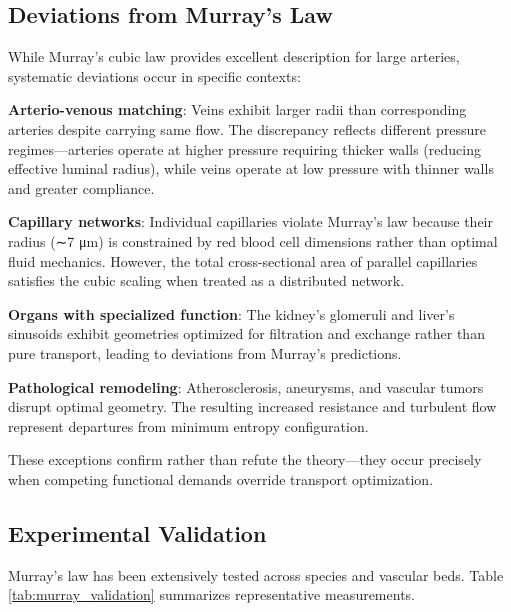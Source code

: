 \documentclass[12pt,a4paper]{article}
\theoremstyle{remark}
\begin{document}
\subsection{Deviations from Murray's Law}

While Murray's cubic law provides excellent description for large arteries, systematic deviations occur in specific contexts:

\textbf{Arterio-venous matching}: Veins exhibit larger radii than corresponding arteries despite carrying same flow. The discrepancy reflects different pressure regimes—arteries operate at higher pressure requiring thicker walls (reducing effective luminal radius), while veins operate at low pressure with thinner walls and greater compliance.

\textbf{Capillary networks}: Individual capillaries violate Murray's law because their radius (∼7 μm) is constrained by red blood cell dimensions rather than optimal fluid mechanics. However, the total cross-sectional area of parallel capillaries satisfies the cubic scaling when treated as a distributed network.

\textbf{Organs with specialized function}: The kidney's glomeruli and liver's sinusoids exhibit geometries optimized for filtration and exchange rather than pure transport, leading to deviations from Murray's predictions.

\textbf{Pathological remodeling}: Atherosclerosis, aneurysms, and vascular tumors disrupt optimal geometry. The resulting increased resistance and turbulent flow represent departures from minimum entropy configuration.

These exceptions confirm rather than refute the theory—they occur precisely when competing functional demands override transport optimization.

\subsection{Experimental Validation}

Murray's law has been extensively tested across species and vascular beds. Table \ref{tab:murray_validation} summarizes representative measurements.
\end{document}
